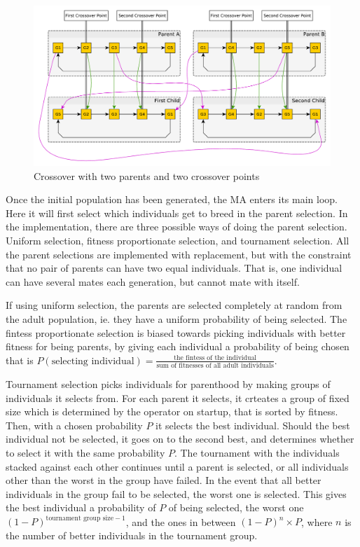 \begin{figure}[thbp]
	\centerline{\includegraphics[width=\textwidth]{figures/Architecture/Crossover_Illustration.pdf}}
	\caption{Crossover with two parents and two crossover points}
	\label{fig:crossover_illustration}
\end{figure}

Once the initial population has been generated, the MA enters its main loop. Here it will first select which individuals get to breed in the parent selection. In the implementation, there are three possible ways of doing the parent selection. Uniform selection, fitness proportionate selection, and tournament selection. All the parent selections are implemented with replacement, but with the constraint that no pair of parents can have two equal individuals. That is, one individual can have several mates each generation, but cannot mate with itself.

If using uniform selection, the parents are selected completely at random from the adult population, ie. they have a uniform probability of being selected. The fintess proportionate selection is biased towards picking individuals with better fitness for being parents, by giving each individual a probability of being chosen that is $P(\text{selecting individual}) = \frac{\text{the fintess of the individual}}{\text{sum of fitnesses of all adult individuals}}$.

Tournament selection picks individuals for parenthood by making groups of individuals it selects from. For each parent it selects, it crteates a group of fixed size which is determined by the operator on startup, that is sorted by fitness. Then, with a chosen probability $P$ it selects the best individual. Should the best individual not be selected, it goes on to the second best, and determines whether to select it with the same probability $P$. The tournament with the individuals stacked against each other continues until a parent is selected, or all individuals other than the worst in the group have failed. In the event that all better individuals in the group fail to be selected, the worst one is selected. This gives the best individual a probability of $P$ of being selected, the worst one $(1-P)^{\text{tournament group size}-1}$, and the ones in between $(1-P)^{n} \times P$, where $n$ is the number of better individuals in the tournament group.

